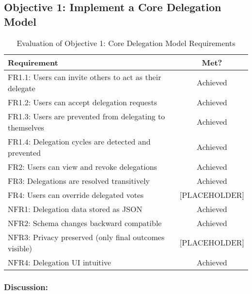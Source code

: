 \subsection{Objective 1: Implement a Core Delegation Model}

\begin{table}[H]
\centering
\begin{tabular}{|p{9cm}|c|}
\hline
\textbf{Requirement} & \textbf{Met?} \\ \hline
FR1.1: Users can invite others to act as their delegate & Achieved \\ \hline
FR1.2: Users can accept delegation requests & Achieved \\ \hline
FR1.3: Users are prevented from delegating to themselves & Achieved \\ \hline
FR1.4: Delegation cycles are detected and prevented & Achieved \\ \hline
FR2: Users can view and revoke delegations & Achieved \\ \hline
FR3: Delegations are resolved transitively & Achieved \\ \hline
FR4: Users can override delegated votes & [PLACEHOLDER] \\ \hline
NFR1: Delegation data stored as JSON & Achieved \\ \hline
NFR2: Schema changes backward compatible & Achieved \\ \hline
NFR3: Privacy preserved (only final outcomes visible) & [PLACEHOLDER] \\ \hline
NFR4: Delegation UI intuitive & Achieved \\ \hline
\end{tabular}
\caption{Evaluation of Objective 1: Core Delegation Model Requirements}
\label{tab:objective1_requirements}
\end{table}

\subsubsection{Discussion:}

